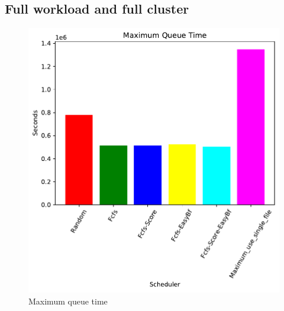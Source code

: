 	\subsection{Full workload and full cluster}
	\begin{figure}[H]
	\begin{minipage}[b]{0.5\linewidth}\centering\includegraphics[width=1\linewidth]{MBSS/plot/2022-03-16_Maximum_queue_time450_128_32_256_4_1024.pdf}\caption{Maximum queue time}\vspace{4ex}\end{minipage}

\end{figure}

